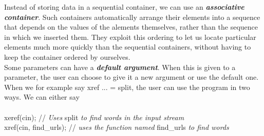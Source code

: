 \documentclass[12p, a4paper]{article}
\begin{document}
Instead of storing data in a sequential container, we can use an \textbf{\textit{associative container}}. Such containers automatically arrange their elements into a sequence that depends on the values of the alements themselves, rather than the sequence in which we inserted them. They exploit this ordering to let us locate particular elements much more quickly than the sequential containers, without having to keep the container ordered by ourselves. \\

Some parameters can have a \textbf{\textit{default argument}}. When this is given to a parameter, the user can choose to give it a new argument or use the default one. When we for example say xref ... = split, the user can use the program in two ways. We can either say\\
\\
xeref(cin); // \textit{Uses} split \textit{to find words in the input stream}  \\
xref(cin, find\_urls); // \textit{uses the function named} find\_urls \textit{to find words}
\end{document}
